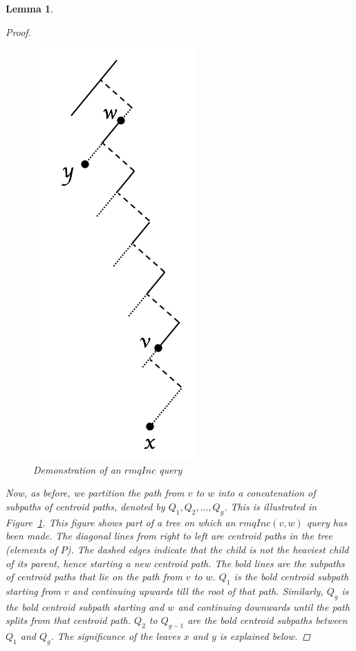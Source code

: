 \documentclass{article}
\newtheorem{rmqinc}[incompatibility]{Lemma}
\begin{document}
\begin{rmqinc}
\begin{proof}
            \begin{figure}[h]
                \includegraphics[scale=0.5]{rmq}
                \centering
                \caption{Demonstration of an $rmqInc$ query}
                \label{fig:rmq}
            \end{figure}

            Now, as before, we partition the path from $v$ to $w$ into a concatenation of subpaths of centroid paths, denoted by $Q_1, Q_2, ..., Q_g$. This is illustrated in Figure~\ref{fig:rmq}. This figure shows part of a tree on which an $rmqInc(v, w)$ query has been made. The diagonal lines from right to left are centroid paths in the tree (elements of $P$). The dashed edges indicate that the child is not the heaviest child of its parent, hence starting a new centroid path. The bold lines are the subpaths of centroid paths that lie on the path from $v$ to $w$. $Q_1$ is the bold centroid subpath starting from $v$ and continuing upwards till the root of that path. Similarly, $Q_g$ is the bold centroid subpath starting and $w$ and continuing downwards until the path splits from that centroid path. $Q_2$ to $Q_{g - 1}$ are the bold centroid subpaths between $Q_1$ and $Q_g$. The significance of the leaves $x$ and $y$ is explained below.


\end{proof}
\end{rmqinc}
\end{document}
